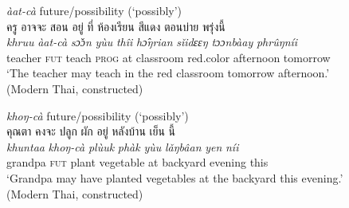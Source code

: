 \documentclass[output=paper,colorlinks,citecolor=brown]{langscibook}
\begin{document}
    \ex \label{ex:7b} \textit{àat-cà} future/possibility (‘possibly’)\\
        \textthai{ครู} \textthai{อาจจะ} \textthai{สอน} \textthai{อยู่} \textthai{ที่} \textthai{ห้องเรียน} \textthai{สีแดง} \textthai{ตอนบ่าย} \textthai{พรุ่งนี้}\\
        \gll \textit{khruu} \textit{àat-cà} \textit{sɔ̌ɔn} \textit{yùu} \textit{thîi} \textit{hɔ̂ŋrian} \textit{sǐidɛɛŋ} \textit{tɔɔnbàay} \textit{phrûŋníi}\\
        teacher \textsc{fut} teach \textsc{prog} at classroom red.color afternoon tomorrow\\
        \glt ‘The teacher may teach in the red classroom tomorrow afternoon.’ \\
        \hfill (Modern Thai, constructed)

    \ex \label{ex:7c} \textit{khoŋ-cà} future/possibility (‘possibly’)\\
        \textthai{คุณตา} \textthai{คงจะ} \textthai{ปลูก} \textthai{ผัก} \textthai{อยู่} \textthai{หลังบ้าน} \textthai{เย็น} \textthai{นี้}\\
        \gll \textit{khuntaa} \textit{khoŋ-cà} \textit{plùuk} \textit{phàk} \textit{yùu} \textit{lǎŋbâan} \textit{yen} \textit{níi}\\
        grandpa \textsc{fut} plant vegetable at backyard evening this\\
        \glt ‘Grandpa may have planted vegetables at the backyard this evening.’ \\
        \hfill (Modern Thai, constructed)
    \z
\z
\end{document}

